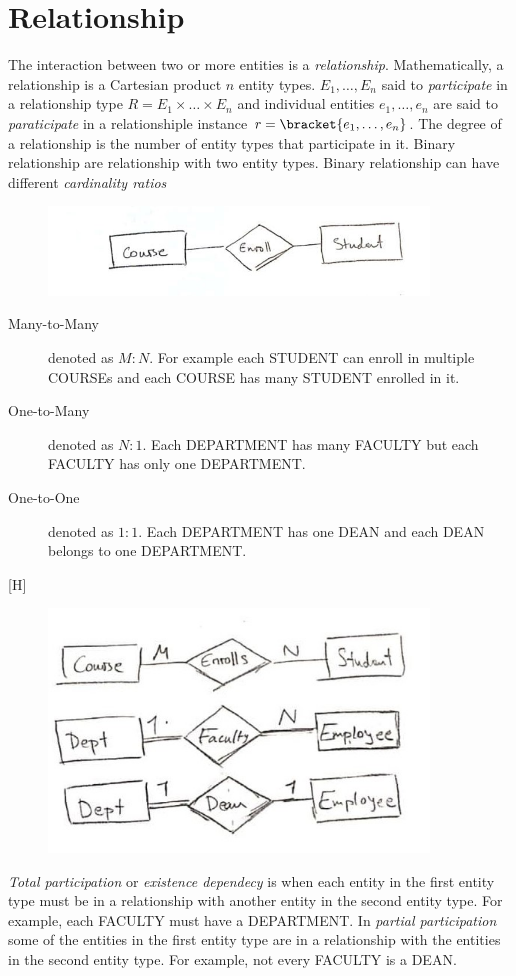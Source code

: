 \section{Relationship}
The interaction between two or more entities is a \textit{relationship}. Mathematically, a relationship is a Cartesian product \(n\) entity types. \(E_1, \dots , E_n\) said to \textit{participate} in a relationship type \(R = E_1 \times \dots \times E_n\) and individual entities \(e_1, \dots , e_n\) are said to \textit{paraticipate} in a relationshiple instance \(r = \bracket{e_1, \dots ,e_n}\). The degree of a relationship is the number of entity types that participate in it. Binary relationship are relationship with two entity types. Binary relationship can have different \textit{cardinality ratios}
\begin{figure}[H]
    \centering
    \includegraphics[width = 0.9\textwidth]{Graphics/relationship.jpg}
\end{figure}
\begin{description}
    \item [Many-to-Many] denoted as \(M:N\). For example each STUDENT can enroll in multiple COURSEs and each COURSE has many STUDENT enrolled in it.
    \item [One-to-Many] denoted as \(N:1\). Each DEPARTMENT has many FACULTY but each FACULTY has only one DEPARTMENT. 
    \item [One-to-One] denoted as \(1:1\). Each DEPARTMENT has one DEAN and each DEAN belongs to one DEPARTMENT.
\end{description}[H]
\begin{figure}
    \centering
    \includegraphics[width = 0.9\textwidth]{Graphics/cardinality.jpg}
\end{figure}
\textit{Total participation} or \textit{existence dependecy} is when each entity in the first entity type must be in a relationship with another entity in the second entity type. For example, each FACULTY must have a DEPARTMENT. In \textit{partial participation} some of the entities in the first entity type are in a relationship with the entities in the second entity type. For example, not every FACULTY is a DEAN. 

